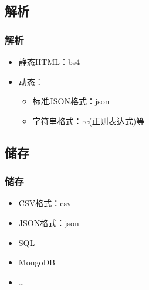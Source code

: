 \documentclass{beamer}
\begin{document}
\subsection{解析}
\begin{frame}
\frametitle{解析}
\begin{itemize}
  \item 静态HTML：bs4\footnotemark
  \item 动态：
  \begin{itemize}
    \item 标准JSON格式：json
    \item 字符串格式：re(正则表达式)等
  \end{itemize}
\end{itemize}
\end{frame}

\subsection{储存}
\begin{frame}
\frametitle{储存}
\begin{itemize}
   \item CSV格式：csv
   \item JSON格式：json
   \item SQL
   \item MongoDB
   \item \ldots
\end{itemize}
\end{frame}
\end{document}
